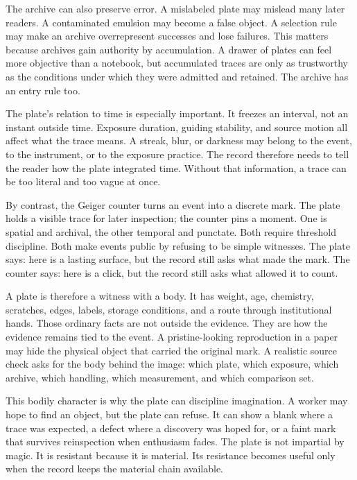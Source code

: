 The archive can also preserve error. A mislabeled plate may mislead many later
readers. A contaminated emulsion may become a false object. A selection rule
may make an archive overrepresent successes and lose failures. This matters
because archives gain authority by accumulation. A drawer of plates can feel
more objective than a notebook, but accumulated traces are only as trustworthy
as the conditions under which they were admitted and retained. The archive has
an entry rule too.

The plate's relation to time is especially important. It freezes an interval,
not an instant outside time. Exposure duration, guiding stability, and source
motion all affect what the trace means. A streak, blur, or darkness may belong
to the event, to the instrument, or to the exposure practice. The record therefore
needs to tell the reader how the plate integrated time. Without that
information, a trace can be too literal and too vague at once.

By contrast, the Geiger counter turns an event into a discrete mark. The
plate holds a visible trace for later inspection; the counter pins a
moment. One is spatial and archival, the other temporal and punctate.
Both require threshold discipline. Both make events public by refusing
to be simple witnesses. The plate says: here is a lasting surface, but
the record still asks what made the mark. The counter says: here is a
click, but the record still asks what allowed it to count.

A plate is therefore a witness with a body. It has weight, age, chemistry,
scratches, edges, labels, storage conditions, and a route through institutional
hands. Those ordinary facts are not outside the evidence. They are how the
evidence remains tied to the event. A pristine-looking reproduction in a paper
may hide the physical object that carried the original mark. A realistic source
check asks for the body behind the image: which plate, which exposure, which
archive, which handling, which measurement, and which comparison set.

This bodily character is why the plate can discipline imagination. A worker may
hope to find an object, but the plate can refuse. It can show a blank where a
trace was expected, a defect where a discovery was hoped for, or a faint mark
that survives reinspection when enthusiasm fades. The plate is not impartial by
magic. It is resistant because it is material. Its resistance becomes useful
only when the record keeps the material chain available.

